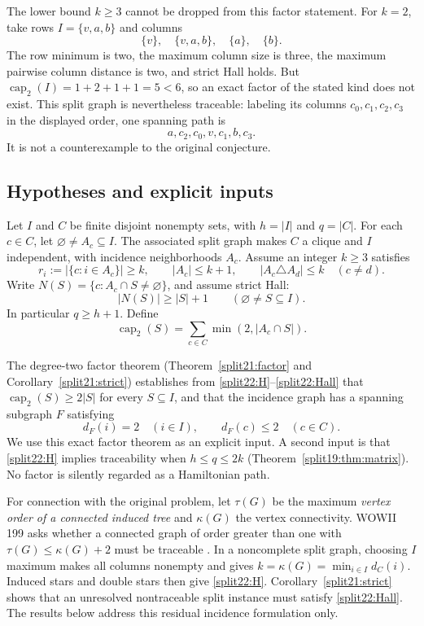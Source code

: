 \documentclass[11pt,a4paper]{article}
\theoremstyle{definition}\newtheorem{definition}[theorem]{Definition}
\theoremstyle{remark}\newtheorem{remark}[theorem]{Remark}
\begin{document}
The lower bound $k\geq3$ cannot be dropped from this factor statement.
For $k=2$, take rows $I=\{v,a,b\}$ and columns
\[
 \{v\},\quad\{v,a,b\},\quad\{a\},\quad\{b\}.
\]
The row minimum is two, the maximum column size is three, the maximum
pairwise column distance is two, and strict Hall holds. But
$\operatorname{cap}_2(I)=1+2+1+1=5<6$, so an exact factor of the stated kind does not
exist. This split graph is nevertheless traceable: labeling its columns
$c_0,c_1,c_2,c_3$ in the displayed order, one spanning path is
\[
 a,c_2,c_0,v,c_1,b,c_3.
\]
It is not a counterexample to the original conjecture.



\subsection{Hypotheses and explicit inputs}

Let $I$ and $C$ be finite disjoint nonempty sets, with $h=|I|$ and $q=|C|$.
For each $c\in C$, let $\varnothing\ne A_c\subseteq I$. The associated split
graph makes $C$ a clique and $I$ independent, with incidence neighborhoods
$A_c$. Assume an integer $k\geq3$ satisfies
\begin{equation}\label{split22:H}
 r_i:=|\{c:i\in A_c\}|\geq k,\qquad
 |A_c|\leq k+1,\qquad |A_c\triangle A_d|\leq k\quad(c\ne d).
\end{equation}
Write $N(S)=\{c:A_c\cap S\ne\varnothing\}$, and assume strict Hall:
\begin{equation}\label{split22:Hall}
 |N(S)|\geq|S|+1\qquad(\varnothing\ne S\subseteq I).
\end{equation}
In particular $q\geq h+1$. Define
\[
 \operatorname{cap}_2(S)=\sum_{c\in C}\min(2,|A_c\cap S|).
\]

The degree-two factor theorem (Theorem~\ref{split21:factor} and Corollary~\ref{split21:strict}) establishes from
\eqref{split22:H}--\eqref{split22:Hall} that $\operatorname{cap}_2(S)\geq2|S|$ for every $S\subseteq I$,
and that the incidence graph has a spanning subgraph $F$ satisfying
\begin{equation}\label{split22:factor}
 d_F(i)=2\quad(i\in I),\qquad d_F(c)\leq2\quad(c\in C).
\end{equation}
We use this exact factor theorem as an explicit input. A second
input is that \eqref{split22:H} implies traceability when $h\leq q\leq2k$
(Theorem~\ref{split19:thm:matrix}). No factor is silently regarded as a Hamiltonian path.

For connection with the original problem, let $\tau(G)$ be the maximum
\emph{vertex order of a connected induced tree} and $\kappa(G)$ the vertex
connectivity. WOWII 199 asks whether a connected graph of order greater than
one with $\tau(G)\leq\kappa(G)+2$ must be traceable \cite{src:catalogue}. In a
noncomplete split graph, choosing $I$ maximum makes all columns nonempty and
gives $k=\kappa(G)=\min_{i\in I}d_C(i)$. Induced stars and double stars then
give \eqref{split22:H}. Corollary~\ref{split21:strict} shows
that an unresolved nontraceable split instance must satisfy \eqref{split22:Hall}.
The results below address this residual incidence formulation only.
\end{document}
